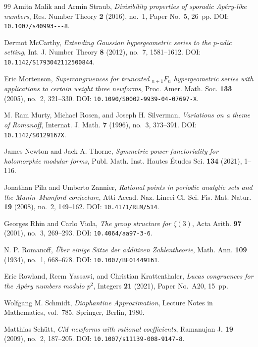 \documentclass[11pt]{amsart}
\theoremstyle{plain}
\theoremstyle{remark}
\begin{document}
\begin{thebibliography}{99}
Amita Malik and Armin Straub,
\emph{Divisibility properties of sporadic Ap\'ery-like numbers},
Res. Number Theory \textbf{2} (2016), no.~1, Paper No.~5, 26~pp.
DOI: \texttt{10.1007/\allowbreak s40993---8}.

Dermot McCarthy,
\emph{Extending Gaussian hypergeometric series to the $p$-adic
setting},
Int. J. Number Theory \textbf{8} (2012), no.~7, 1581--1612.
DOI: \texttt{10.1142/S1793042112500844}.

Eric Mortenson,
\emph{Supercongruences for truncated ${}_{n+1}F_n$ hypergeometric series
with applications to certain weight three newforms},
Proc. Amer. Math. Soc. \textbf{133} (2005), no.~2, 321--330.
DOI: \texttt{10.1090/S0002-9939-04-07697-X}.

M. Ram Murty, Michael Rosen, and Joseph H. Silverman,
\emph{Variations on a theme of Romanoff},
Internat. J. Math. \textbf{7} (1996), no.~3, 373--391.
DOI: \texttt{10.1142/\allowbreak S0129167X}.

James Newton and Jack A. Thorne,
\emph{Symmetric power functoriality for holomorphic modular forms},
Publ. Math. Inst. Hautes \'Etudes Sci. \textbf{134} (2021), 1--116.

Jonathan Pila and Umberto Zannier,
\emph{Rational points in periodic analytic sets and the
Manin--Mumford conjecture},
Atti Accad. Naz. Lincei Cl. Sci. Fis. Mat. Natur. \textbf{19} (2008),
no.~2, 149--162.
DOI: \texttt{10.4171/RLM/514}.

Georges Rhin and Carlo Viola,
\emph{The group structure for $\zeta(3)$},
Acta Arith. \textbf{97} (2001), no.~3, 269--293.
DOI: \texttt{10.4064/aa97-3-6}.

N. P. Romanoff,
\emph{\"Uber einige S\"atze der additiven Zahlentheorie},
Math. Ann. \textbf{109} (1934), no.~1, 668--678.
DOI: \texttt{10.1007/BF01449161}.

Eric Rowland, Reem Yassawi, and Christian Krattenthaler,
\emph{Lucas congruences for the Ap\'ery numbers modulo $p^2$},
Integers \textbf{21} (2021), Paper No.~A20, 15~pp.

Wolfgang M. Schmidt,
\emph{Diophantine Approximation},
Lecture Notes in Mathematics, vol.~785, Springer, Berlin, 1980.

Matthias Sch\"utt,
\emph{CM newforms with rational coefficients},
Ramanujan J. \textbf{19} (2009), no.~2, 187--205.
DOI: \texttt{10.1007/s11139-008-9147-8}.


\end{thebibliography}
\end{document}
